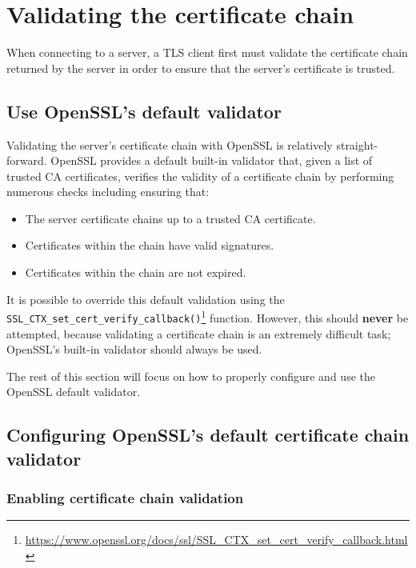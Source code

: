 \documentclass{article}
\begin{document}
\section{Validating the certificate chain}
\label{sec:certchain}
When connecting to a server, a TLS client first must validate the certificate
chain returned by the server in order to ensure that the server's certificate
is trusted.


\subsection{Use OpenSSL's default validator}
\label{sec:defaultvalidator}

Validating the server's certificate chain with OpenSSL is relatively
straight-forward. OpenSSL provides a default built-in validator that, given a
list of trusted CA certificates, verifies the validity of a certificate chain
by performing numerous checks including ensuring that:

\begin{itemize}
    \item The server certificate chains up to a trusted CA certificate.
    \item Certificates within the chain have valid signatures.
    \item Certificates within the chain are not expired.
\end{itemize}

It is possible to override this default validation using the 
{\tt SSL\_CTX\_set\_cert\_verify\_callback()}\footnote{\url{https://www.openssl.org/docs/ssl/SSL_CTX_set_cert_verify_callback.html}}
function. However, this should \textbf{never} be attempted, because validating
a certificate chain is an extremely difficult task; OpenSSL's built-in
validator should always be used.

The rest of this section will focus on how to properly configure and use the
OpenSSL default validator.

\subsection{Configuring OpenSSL's default certificate chain validator}

\subsubsection{Enabling certificate chain validation}
\end{document}
